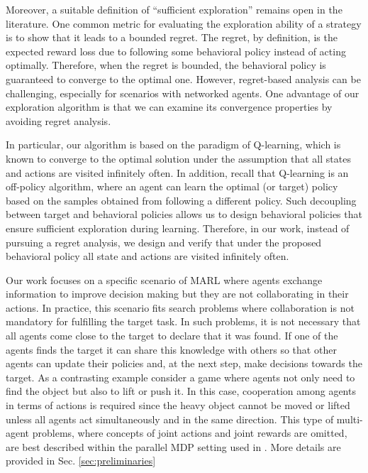 \documentclass[lettersize,journal]{IEEEtran}
\begin{document}
Moreover,  a suitable definition of ``sufficient exploration'' remains open in the literature. One common metric for evaluating the exploration ability of a strategy is to show that it leads to a bounded regret. The regret, by definition,  is the expected reward loss due to following some behavioral policy instead of acting optimally. Therefore, when the regret is bounded, the behavioral policy is guaranteed to converge to the optimal one. However, regret-based analysis can be challenging, especially for scenarios with networked agents. One advantage of our exploration algorithm is that we can examine its convergence properties by  avoiding regret analysis.\par 
In particular, our algorithm is based on the paradigm of Q-learning, which is known to converge to the optimal solution under the assumption that all states and actions are visited infinitely often. In addition, recall that Q-learning is an off-policy algorithm, where an agent can learn the optimal (or target) policy based on the samples obtained from following a different policy. Such decoupling between target and behavioral policies allows us to design behavioral policies that ensure sufficient exploration during learning. Therefore, in our work, instead of pursuing a regret analysis, we design and verify that under the proposed behavioral policy all state and actions are visited infinitely often.
\par 

  
  \par 
 \par
  Our work focuses on a specific scenario of MARL where agents exchange information to improve decision making but they are not collaborating in their actions.  %
  In practice, this scenario fits search problems where  collaboration is not mandatory for fulfilling the target task. In such problems, it is not necessary that all agents come close to the target to declare that it was found. If one of the agents finds the target it can share this knowledge with others so that other agents can update their policies  and, at the next step, make decisions towards the target.  As a contrasting example consider a game where agents not only need to find the object but also to lift or push it. In this case, cooperation among agents in terms of actions is required since the heavy object cannot be moved or lifted unless all agents act simultaneously and in the same direction.   
   This type of multi-agent problems, where concepts of joint actions and joint rewards are omitted, are best described within the parallel MDP setting used in \cite{LSVI_based,justin}. More details are provided in Sec. \ref{sec:preliminaries}\par
\end{document}
